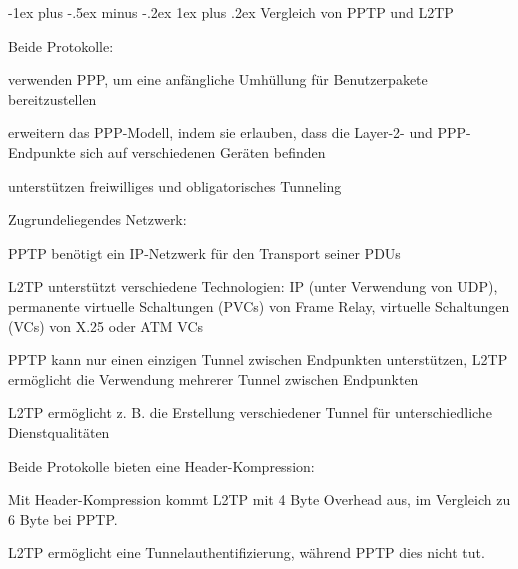 \documentclass[a4paper]{article}
\makeatletter
\renewcommand{\subsubsection}{\@startsection{subsubsection}{3}{0mm}%
 {-1ex plus -.5ex minus -.2ex}%
 {1ex plus .2ex}%
 {\normalfont\small\bfseries}}
\makeatother
\begin{document}
\begin{multicols}{3}
      \subsubsection{Vergleich von PPTP und
            L2TP}

      \begin{itemize*}
            \item Beide Protokolle:
            \begin{itemize*}
                  \item verwenden PPP, um eine anfängliche Umhüllung für Benutzerpakete bereitzustellen
                  \item erweitern das PPP-Modell, indem sie erlauben, dass die Layer-2- und PPP-Endpunkte sich auf verschiedenen Geräten befinden
                  \item unterstützen freiwilliges und obligatorisches Tunneling
            \end{itemize*}
            \item Zugrundeliegendes Netzwerk:
            \begin{itemize*}
                  \item PPTP benötigt ein IP-Netzwerk für den Transport seiner PDUs
                  \item L2TP unterstützt verschiedene Technologien: IP (unter Verwendung von UDP), permanente virtuelle Schaltungen (PVCs) von Frame Relay, virtuelle Schaltungen (VCs) von X.25 oder ATM VCs
            \end{itemize*}
            \item PPTP kann nur einen einzigen Tunnel zwischen Endpunkten unterstützen,
            L2TP ermöglicht die Verwendung mehrerer Tunnel zwischen Endpunkten
            \begin{itemize*}
                  \item L2TP ermöglicht z. B. die Erstellung verschiedener Tunnel für unterschiedliche Dienstqualitäten
            \end{itemize*}
            \item Beide Protokolle bieten eine Header-Kompression:
            \begin{itemize*}
                  \item Mit Header-Kompression kommt L2TP mit 4 Byte Overhead aus, im Vergleich zu 6 Byte bei PPTP.
            \end{itemize*}
            \item L2TP ermöglicht eine Tunnelauthentifizierung, während PPTP dies nicht
            tut.
      \end{itemize*}



\end{multicols}
\end{document}
